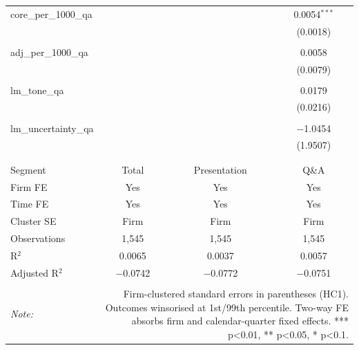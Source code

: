 \begin{table}[!htbp]
\begin{tabular}{@{\extracolsep{5pt}}lccc}
 core\_per\_1000\_qa &  &  & 0.0054$^{***}$ \\ 
  &  &  & (0.0018) \\ 
  & & & \\ 
 adj\_per\_1000\_qa &  &  & 0.0058 \\ 
  &  &  & (0.0079) \\ 
  & & & \\ 
 lm\_tone\_qa &  &  & 0.0179 \\ 
  &  &  & (0.0216) \\ 
  & & & \\ 
 lm\_uncertainty\_qa &  &  & $-$1.0454 \\ 
  &  &  & (1.9507) \\ 
  & & & \\ 
\hline \\[-1.8ex] 
Segment & Total & Presentation & Q\&A \\ 
Firm FE & Yes & Yes & Yes \\ 
Time FE & Yes & Yes & Yes \\ 
Cluster SE & Firm & Firm & Firm \\ 
Observations & 1,545 & 1,545 & 1,545 \\ 
R$^{2}$ & 0.0065 & 0.0037 & 0.0057 \\ 
Adjusted R$^{2}$ & $-$0.0742 & $-$0.0772 & $-$0.0751 \\ 
\hline 
\hline \\[-1.8ex] 
\textit{Note:}  & \multicolumn{3}{r}{Firm-clustered standard errors in parentheses (HC1). Outcomes winsorised at 1st/99th percentile. Two-way FE absorbs firm and calendar-quarter fixed effects. *** p<0.01, ** p<0.05, * p<0.1.} \\ 
\end{tabular} 
\end{table} 
